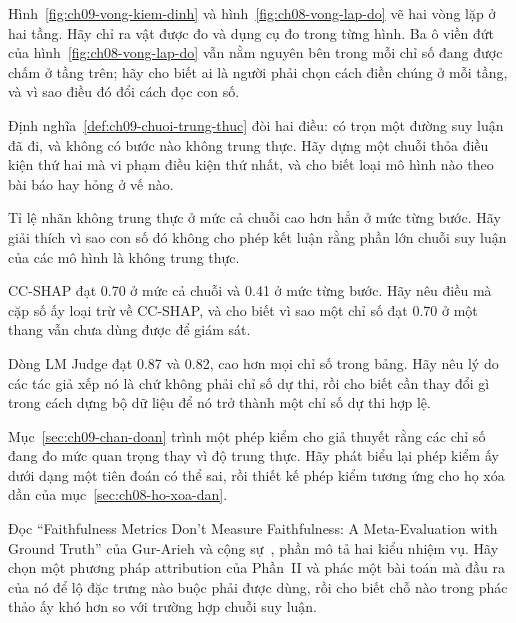 \cauhoi
\begin{cauhoids}
  \item Hình~\ref{fig:ch09-vong-kiem-dinh} và
  hình~\ref{fig:ch08-vong-lap-do} vẽ hai vòng lặp ở hai tầng. Hãy chỉ ra vật
  được đo và dụng cụ đo trong từng hình. Ba ô viền đứt của
  hình~\ref{fig:ch08-vong-lap-do} vẫn nằm nguyên bên trong mỗi chỉ số đang được
  chấm ở tầng trên; hãy cho biết ai là người phải chọn cách điền chúng ở mỗi
  tầng, và vì sao điều đó đổi cách đọc con số.
  \item Định nghĩa~\ref{def:ch09-chuoi-trung-thuc} đòi hai điều: có trọn một
  đường suy luận đã đi, và không có bước nào không trung thực. Hãy dựng một
  chuỗi thỏa điều kiện thứ hai mà vi phạm điều kiện thứ nhất, và cho biết loại
  mô hình nào theo bài báo hay hỏng ở vế nào.
  \item Tỉ lệ nhãn không trung thực ở mức cả chuỗi cao hơn hẳn ở mức từng bước.
  Hãy giải thích vì sao con số đó không cho phép kết luận rằng phần lớn chuỗi
  suy luận của các mô hình là không trung thực.
  \item CC-SHAP đạt 0.70 ở mức cả chuỗi và 0.41 ở mức từng bước. Hãy nêu điều
  mà cặp số ấy loại trừ về CC-SHAP, và cho biết vì sao một chỉ số đạt 0.70 ở
  một thang vẫn chưa dùng được để giám sát.
  \item Dòng LM Judge đạt 0.87 và 0.82, cao hơn mọi chỉ số trong bảng. Hãy nêu
  lý do các tác giả xếp nó là  chứ không phải chỉ số
  dự thi, rồi cho
  biết cần thay đổi gì trong cách dựng bộ dữ liệu để nó trở thành một chỉ số
  dự thi hợp lệ.
  \item Mục~\ref{sec:ch09-chan-doan} trình một phép kiểm cho giả thuyết rằng
  các chỉ số đang đo mức quan trọng thay vì độ trung thực. Hãy phát biểu lại
  phép kiểm ấy dưới dạng một tiên đoán có thể sai, rồi thiết kế phép kiểm
  tương ứng cho họ xóa dần của mục~\ref{sec:ch08-ho-xoa-dan}.
  \item Đọc \enquote{Faithfulness Metrics Don't Measure Faithfulness: A
  Meta-Evaluation with Ground Truth} của Gur-Arieh và cộng
  sự~\autocite{p21metrics}, phần mô tả hai kiểu nhiệm vụ. Hãy chọn một phương
  pháp attribution của Phần~II và phác một bài toán mà đầu ra của nó để lộ
  đặc trưng nào buộc phải được dùng, rồi cho biết chỗ nào trong phác thảo ấy
  khó hơn so với trường hợp chuỗi suy luận.
\end{cauhoids}
